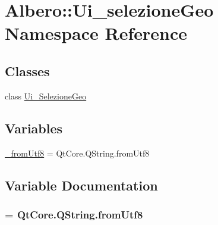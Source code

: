 \hypertarget{namespaceAlbero_1_1Ui__selezioneGeo}{
\section{Albero::Ui\_\-selezioneGeo Namespace Reference}
\label{namespaceAlbero_1_1Ui__selezioneGeo}
}
\subsection*{Classes}
\begin{DoxyCompactItemize}
\item 
class \hyperlink{classAlbero_1_1Ui__selezioneGeo_1_1Ui__SelezioneGeo}{Ui\_\-SelezioneGeo}
\end{DoxyCompactItemize}
\subsection*{Variables}
\begin{DoxyCompactItemize}
\item 
\hyperlink{namespaceAlbero_1_1Ui__selezioneGeo_a4a05b71a1ad3a5b9ed4c8c6842fadcc7}{\_\-fromUtf8} = QtCore.QString.fromUtf8
\end{DoxyCompactItemize}


\subsection{Variable Documentation}
\hypertarget{namespaceAlbero_1_1Ui__selezioneGeo_a4a05b71a1ad3a5b9ed4c8c6842fadcc7}{
\subsubsection[{\_\-fromUtf8}]{ = QtCore.QString.fromUtf8}}
\label{namespaceAlbero_1_1Ui__selezioneGeo_a4a05b71a1ad3a5b9ed4c8c6842fadcc7}
